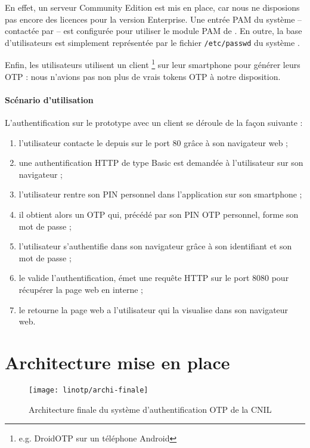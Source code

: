 En effet, un serveur \alinotp{} Community Edition est mis en place, car nous ne disposions pas encore des licences pour la version Enterprise.
Une entrée PAM du système -- contactée par \amodpam{} -- est configurée pour utiliser le module PAM de \alinotp.
En outre, la base d'utilisateurs est simplement représentée par le fichier \texttt{/etc/passwd} du système \alinux. 

Enfin, les utilisateurs utilisent un client \amotp{}\footnote{e.g. DroidOTP sur un téléphone Android} sur leur smartphone pour générer leurs OTP : nous n'avions pas non plus de vrais tokens OTP à notre disposition.

\paragraph{Scénario d'utilisation}
L'authentification sur le prototype avec un client \amotp{} se déroule de la façon suivante :

\begin{enumerate}
	\item l'utilisateur contacte le \arp{} depuis \ainternet{} sur le port 80 grâce à son navigateur web ;
	\item une authentification HTTP de type Basic est demandée à l'utilisateur sur son navigateur ;
	\item l'utilisateur rentre son PIN \amotp{} personnel dans l'application \amotp{} sur son smartphone ;
	\item il obtient alors un OTP qui, précédé par son PIN OTP personnel, forme son mot de passe ;
	\item l'utilisateur s'authentifie dans son navigateur grâce à son identifiant et son mot de passe ;
	\item le \arp{} valide l'authentification, émet une requête HTTP sur le port 8080 pour récupérer la page web en interne ;
	\item le \arp{} retourne la page web a l'utilisateur qui la visualise dans son navigateur web.
\end{enumerate}


\section{Architecture mise en place}
\label{section:linotp:archi-finale}

\begin{figure}
	\centering
	\texttt{[image: linotp/archi-finale]}
	\caption{Architecture finale du système d'authentification OTP de la CNIL}
	\label{figure:linotp:archi-finale}
\end{figure}

